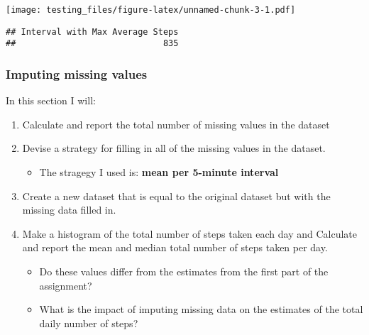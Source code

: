 \documentclass[]{article}
\newenvironment{Shaded}{\begin{snugshade}}{\end{snugshade}}
\newcommand{\KeywordTok}[1]{\textcolor[rgb]{0.13,0.29,0.53}{\textbf{#1}}}
\newcommand{\DecValTok}[1]{\textcolor[rgb]{0.00,0.00,0.81}{#1}}
\newcommand{\StringTok}[1]{\textcolor[rgb]{0.31,0.60,0.02}{#1}}
\newcommand{\CommentTok}[1]{\textcolor[rgb]{0.56,0.35,0.01}{\textit{#1}}}
\newcommand{\OperatorTok}[1]{\textcolor[rgb]{0.81,0.36,0.00}{\textbf{#1}}}
\newcommand{\NormalTok}[1]{#1}
\providecommand{\tightlist}{%
  \setlength{\itemsep}{0pt}\setlength{\parskip}{0pt}}
\begin{document}
\texttt{[image: testing\_files/figure-latex/unnamed-chunk-3-1.pdf]}

\begin{Shaded}
\end{Shaded}

\begin{verbatim}
## Interval with Max Average Steps 
##                             835
\end{verbatim}

\subsubsection{Imputing missing values}\label{imputing-missing-values}

In this section I will:

\begin{enumerate}
\def\labelenumi{\arabic{enumi}.}
\tightlist
\item
  Calculate and report the total number of missing values in the dataset
\item
  Devise a strategy for filling in all of the missing values in the
  dataset.

  \begin{itemize}
  \tightlist
  \item
    The stragegy I used is: \textbf{mean per 5-minute interval}
  \end{itemize}
\item
  Create a new dataset that is equal to the original dataset but with
  the missing data filled in.
\item
  Make a histogram of the total number of steps taken each day and
  Calculate and report the mean and median total number of steps taken
  per day.

  \begin{itemize}
  \tightlist
  \item
    Do these values differ from the estimates from the first part of the
    assignment?
  \item
    What is the impact of imputing missing data on the estimates of the
    total daily number of steps?
  \end{itemize}
\end{enumerate}
\end{document}
